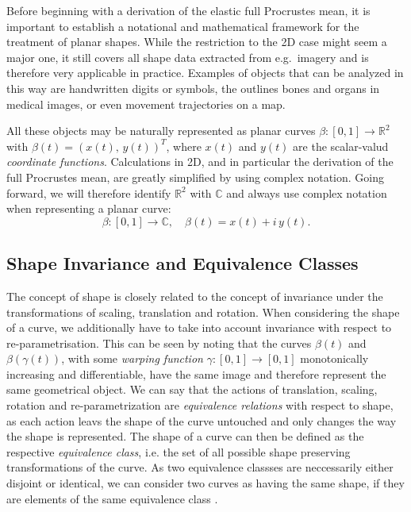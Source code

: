 Before beginning with a derivation of the elastic full Procrustes mean, it is
important to establish a notational and mathematical framework for the
treatment of planar shapes.
While the restriction to the 2D case might seem a major one, it still covers
all shape data extracted from e.g.\ imagery and is therefore very applicable in
practice.
Examples of objects that can be analyzed in this way are handwritten digits or
symbols, the outlines bones and organs in medical images, or even movement
trajectories on a map.

All these objects may be naturally represented as planar curves $\beta : [0,1]
\rightarrow \mathbb{R}^2$ with $\beta(t) = (x(t),\, y(t))^T$, where $x(t)$ and
$y(t)$ are the scalar-valud \textit{coordinate functions}.
Calculations in 2D, and in particular the derivation of the
full Procrustes mean, are greatly simplified by using complex notation.
Going forward, we will therefore identify $\mathbb{R}^2$ with $\mathbb{C}$ and
always use complex notation when representing a planar curve:
$$\beta : [0,1] \rightarrow \mathbb{C}, \quad \beta(t) = x(t) + i\, y(t).$$

\subsection{Shape Invariance and Equivalence Classes}
\label{theo:inv}
The concept of shape is closely related to the concept of invariance under the
transformations of scaling, translation and rotation.
When considering the shape of a curve, we additionally have to take into
account invariance with respect to re-parametrisation.
This can be seen by noting that the curves $\beta(t)$ and $\beta(\gamma(t))$,
with some \textit{warping function} $\gamma : [0,1] \rightarrow [0,1]$
monotonically increasing and differentiable, have the same image and therefore
represent the same geometrical object.
We can say that the actions of translation, scaling, rotation and
re-parametrization are \textit{equivalence relations} with respect to shape, as
each action leavs the shape of the curve untouched and only changes the way the
shape is represented.
The shape of a curve can then be defined as the respective \textit{equivalence
class}, i.e. the set of all possible shape preserving transformations of the
curve.
As two equivalence classses are neccessarily either disjoint or identical, we
can consider two curves as having the same shape, if they are elements of the
same equivalence class \parencite[see][40]{SrivastavaKlassen2016}.


